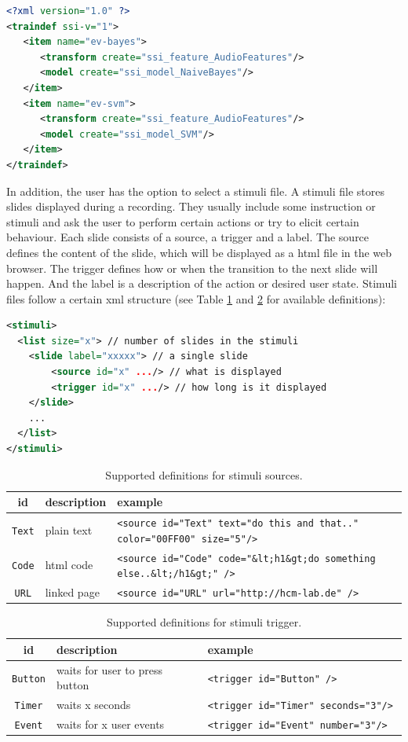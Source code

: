 \begin{lstlisting}[language=xml]
<?xml version="1.0" ?>
<traindef ssi-v="1">
   <item name="ev-bayes">
      <transform create="ssi_feature_AudioFeatures"/>
      <model create="ssi_model_NaiveBayes"/>
   </item>	
   <item name="ev-svm">
      <transform create="ssi_feature_AudioFeatures"/>
      <model create="ssi_model_SVM"/>
   </item>	
</traindef>
\end{lstlisting}

In addition, the user has the option to select a stimuli file. A stimuli file stores slides displayed during a recording. They  usually include some instruction or stimuli and ask the user to perform certain actions or try to elicit certain behaviour. Each slide consists of a source, a trigger and a label. The source defines the content of the slide, which will be displayed as a html file in the web browser. The trigger defines how or when the transition to the next slide will happen. And the label is a description of the action or desired user state. Stimuli files follow a certain xml structure (see Table \ref{tab:stimuli_source} and \ref{tab:stimuli_trigger} for available definitions):

\begin{lstlisting}[language=xml]
<stimuli>
  <list size="x"> // number of slides in the stimuli
    <slide label="xxxxx"> // a single slide
        <source id="x" .../> // what is displayed
        <trigger id="x" .../> // how long is it displayed
    </slide>
    ...
  </list>
</stimuli>
\end{lstlisting}

\begin{table}
\begin{tabular}{clp{11cm}}
{\bf id} & {\bf description} & {\bf example} \\
\hline
\texttt{Text} & plain text & \texttt{<source id="Text" text="do this and that.." color="00FF00" size="5"/> } \\
\texttt{Code} & html code & \texttt{<source id="Code" code="\&lt;h1\&gt;do something else..\&lt;/h1\&gt;" /> } \\
\texttt{URL} & linked page & \texttt{<source id="URL" url="http://hcm-lab.de" /> } \\
\hline
\end{tabular}
\caption{Supported definitions for stimuli sources.}
\label{tab:stimuli_source}
\end{table}

\begin{table}
\begin{tabular}{clp{7.6cm}}
{\bf id} & {\bf description} & {\bf example} \\
\hline
\texttt{Button} & waits for user to press button & \texttt{<trigger id="Button" /> } \\
\texttt{Timer} & waits x seconds & \texttt{<trigger id="Timer" seconds="3"/> } \\
\texttt{Event} & waits for x user events & \texttt{<trigger id="Event" number="3"/> } \\
\hline
\end{tabular}
\caption{Supported definitions for stimuli trigger.}
\label{tab:stimuli_trigger}
\end{table}

